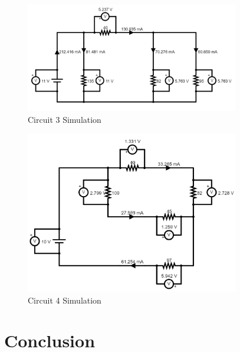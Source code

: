 \documentclass[12pt]{iopart} %
\begin{document}
\begin{figure}[htbp]
  \begin{indented}
  \item[]\includegraphics[width=0.83\textwidth]{media/circuit-3-simulation.png}
  \end{indented}
  \caption{\label{fig:circuit_3_simulation}
  Circuit 3 Simulation
  }
\end{figure}

\begin{figure}[htbp]
  \begin{indented}
  \item[]\includegraphics[width=0.83\textwidth]{media/circuit-4-simulation.png}
  \end{indented}
  \caption{\label{fig:circuit_4_simulation}
  Circuit 4 Simulation
  }
\end{figure}

\clearpage

\section{Conclusion}
\end{document}
